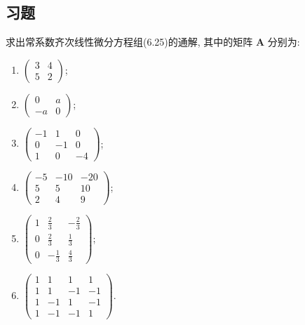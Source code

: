 \subsection{习题}



\begin{exercise}
  求出常系数齐次线性微分方程组(6.25)的通解, 其中的矩阵 $\bm{A}$ 分别为:
  \begin{enumerate}
    \item $\displaystyle\begin{pmatrix}3&4\\5&2\end{pmatrix}$;
    \item $\displaystyle\begin{pmatrix}0&a\\-a&0\end{pmatrix}$;
    \item $\displaystyle\begin{pmatrix}-1&1&0\\0&-1&0\\1&0&-4\end{pmatrix}$;
    \item $\displaystyle\begin{pmatrix}-5&-10&-20\\5&5&10\\2&4&9\end{pmatrix}$;
    \item $\displaystyle\begin{pmatrix}1&\frac{2}{3}&-\frac{2}{3}\\0&\frac{2}{3}&\frac{1}{3}\\0&-\frac{1}{3}&\frac{4}{3}\end{pmatrix}$;
    \item $\displaystyle\begin{pmatrix}1&1&1&1\\1&1&-1&-1\\1&-1&1&-1\\1&-1&-1&1\end{pmatrix}$.
  \end{enumerate}
\end{exercise}

